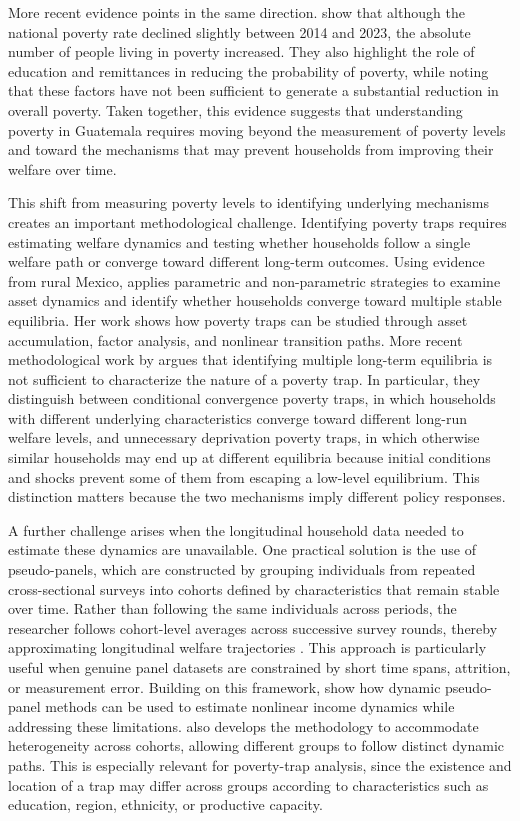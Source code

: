 \documentclass{article}
\begin{document}
More recent evidence points in the same direction. \textcite{diazcastellanos2024} show that although the national poverty rate declined slightly between 2014 and 2023, the absolute number of people living in poverty increased. They also highlight the role of education and remittances in reducing the probability of poverty, while noting that these factors have not been sufficient to generate a substantial reduction in overall poverty. Taken together, this evidence suggests that understanding poverty in Guatemala requires moving beyond the measurement of poverty levels and toward the mechanisms that may prevent households from improving their welfare over time.

This shift from measuring poverty levels to identifying underlying mechanisms creates an important methodological challenge. Identifying poverty traps requires estimating welfare dynamics and testing whether households follow a single welfare path or converge toward different long-term outcomes. Using evidence from rural Mexico, \textcite{chiodi2009} applies parametric and non-parametric strategies to examine asset dynamics and identify whether households converge toward multiple stable equilibria. Her work shows how poverty traps can be studied through asset accumulation, factor analysis, and nonlinear transition paths. More recent methodological work by \textcite{alloush2023} argues that identifying multiple long-term equilibria is not sufficient to characterize the nature of a poverty trap. In particular, they distinguish between conditional convergence poverty traps, in which households with different underlying characteristics converge toward different long-run welfare levels, and unnecessary deprivation poverty traps, in which otherwise similar households may end up at different equilibria because initial conditions and shocks prevent some of them from escaping a low-level equilibrium. This distinction matters because the two mechanisms imply different policy responses.

A further challenge arises when the longitudinal household data needed to estimate these dynamics are unavailable. One practical solution is the use of pseudo-panels, which are constructed by grouping individuals from repeated cross-sectional surveys into cohorts defined by characteristics that remain stable over time. Rather than following the same individuals across periods, the researcher follows cohort-level averages across successive survey rounds, thereby approximating longitudinal welfare trajectories \parencite{mckenzie2004}. This approach is particularly useful when genuine panel datasets are constrained by short time spans, attrition, or measurement error. Building on this framework, \textcite{antman2005} show how dynamic pseudo-panel methods can be used to estimate nonlinear income dynamics while addressing these limitations. \textcite{mckenzie2004} also develops the methodology to accommodate heterogeneity across cohorts, allowing different groups to follow distinct dynamic paths. This is especially relevant for poverty-trap analysis, since the existence and location of a trap may differ across groups according to characteristics such as education, region, ethnicity, or productive capacity.
\end{document}
